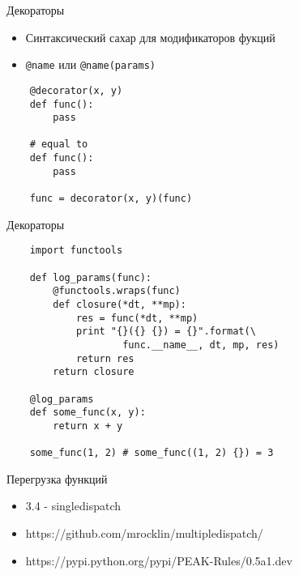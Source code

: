 \documentclass{article}
\begin{document}
\begin{center} Декораторы \end{center}
\begin{itemize}
    \item Синтаксический сахар для модификаторов фукций
    \item \lstinline!@name! или \lstinline!@name(params)!
\end{itemize}
\vspace{15pt}
\begin{lstlisting}
    @decorator(x, y)
    def func():
        pass

    # equal to
    def func():
        pass

    func = decorator(x, y)(func)
\end{lstlisting}
\newpage

\begin{center} Декораторы \end{center}
\vspace{15pt}
\begin{lstlisting}
    import functools

    def log_params(func):
        @functools.wraps(func)
        def closure(*dt, **mp):
            res = func(*dt, **mp)
            print "{}({} {}) = {}".format(\
                    func.__name__, dt, mp, res)
            return res
        return closure

    @log_params
    def some_func(x, y):
        return x + y

    some_func(1, 2) # some_func((1, 2) {}) = 3
\end{lstlisting}
\newpage

\begin{center} Перегрузка функций \end{center}
\begin{itemize}
    \item 3.4 - singledispatch
    \item https://github.com/mrocklin/multipledispatch/
    \item https://pypi.python.org/pypi/PEAK-Rules/0.5a1.dev
\end{itemize}
\newpage
\end{document}
